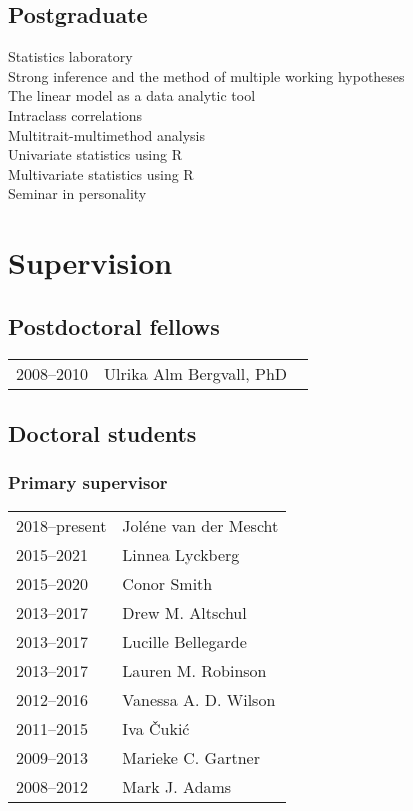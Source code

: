 \documentclass[11pt]{article}
\begin{document}
\subsection*{Postgraduate}
Statistics laboratory \\
Strong inference and the method of multiple working hypotheses \\
The linear model as a data analytic tool \\
Intraclass correlations \\
Multitrait-multimethod analysis \\
Univariate statistics using R \\
Multivariate statistics using R \\
Seminar in personality

\section*{Supervision}
\subsection*{Postdoctoral fellows}

\begin{tabular}{p{3cm}p{12cm}}
2008--2010 & Ulrika Alm Bergvall, PhD \
\end{tabular}

\subsection*{Doctoral students}

\subsubsection*{Primary supervisor}
\begin{tabular}{p{3cm}p{12cm}}
2018--present & Joléne van der Mescht \\
2015--2021 & Linnea Lyckberg \\
2015--2020 & Conor Smith \\
2013--2017 & Drew M. Altschul \\
2013--2017 & Lucille Bellegarde \\
2013--2017 & Lauren M. Robinson \\
2012--2016 & Vanessa A. D. Wilson \\
2011--2015 & Iva Čukić \\
2009--2013 & Marieke C. Gartner \\
2008--2012 & Mark J. Adams
\end{tabular}
\end{document}
